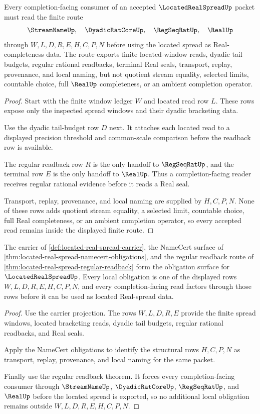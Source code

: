 \begin{theorem}
\label{thm:located-real-spread-regular-readback}
Every completion-facing consumer of an accepted $\LocatedRealSpreadUp$ packet must read the finite route
$$
\StreamNameUp,\quad \DyadicRatCoreUp,\quad \RegSeqRatUp,\quad \RealUp
$$
through $W,L,D,R,E,H,C,P,N$ before using the located spread as Real-completeness data. The route exports finite located-window reads, dyadic tail budgets, regular rational readbacks, terminal Real seals, transport, replay, provenance, and local naming, but not quotient stream equality, selected limits, countable choice, full $\RealUp$ completeness, or an ambient completion operator.
\end{theorem}
\begin{proof}
Start with the finite window ledger $W$ and located read row $L$. These rows expose only the inspected spread windows and their dyadic bracketing data.

Use the dyadic tail-budget row $D$ next. It attaches each located read to a displayed precision threshold and common-scale comparison before the readback row is available.

The regular readback row $R$ is the only handoff to $\RegSeqRatUp$, and the terminal row $E$ is the only handoff to $\RealUp$. Thus a completion-facing reader receives regular rational evidence before it reads a Real seal.

Transport, replay, provenance, and local naming are supplied by $H,C,P,N$. None of these rows adds quotient stream equality, a selected limit, countable choice, full Real completeness, or an ambient completion operator, so every accepted read remains inside the displayed finite route.
\end{proof}

\begin{theorem}
\label{thm:located-real-spread-obligation-closure}
The carrier of \autoref{def:located-real-spread-carrier}, the NameCert surface of \autoref{thm:located-real-spread-namecert-obligations}, and the regular readback route of \autoref{thm:located-real-spread-regular-readback} form the obligation surface for $\LocatedRealSpreadUp$. Every local obligation is one of the displayed rows $W,L,D,R,E,H,C,P,N$, and every completion-facing read factors through those rows before it can be used as located Real-spread data.
\end{theorem}
\begin{proof}
Use the carrier projection. The rows $W,L,D,R,E$ provide the finite spread windows, located bracketing reads, dyadic tail budgets, regular rational readbacks, and Real seals.

Apply the NameCert obligations to identify the structural rows $H,C,P,N$ as transport, replay, provenance, and local naming for the same packet.

Finally use the regular readback theorem. It forces every completion-facing consumer through $\StreamNameUp$, $\DyadicRatCoreUp$, $\RegSeqRatUp$, and $\RealUp$ before the located spread is exported, so no additional local obligation remains outside $W,L,D,R,E,H,C,P,N$.
\end{proof}


